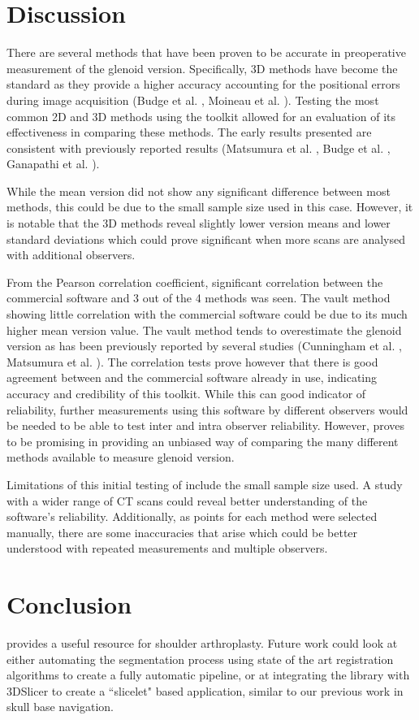 \section{Discussion}
\label{sec:discussion}
There are several methods that have been proven to be accurate in preoperative measurement of 
the glenoid version. Specifically, 3D methods have become the standard as they
provide a higher accuracy accounting for the positional errors during image acquisition
(Budge et al. \cite{BUDGE2011577}, Moineau et al. \cite{PMID:22964089}). 
Testing the most common 2D and 3D methods using the 
\sksglenoid toolkit allowed for an evaluation of its effectiveness in comparing these methods. 
The early results presented are consistent with 
previously reported results (Matsumura et al. \cite{PMID:24618285}, 
Budge et al. \cite{BUDGE2011577}, Ganapathi et al. \cite{PMID:20933439}).

While the mean version did not show any significant difference between most methods, 
this could be due to the small sample size used in this case. However, it is notable
that the 3D methods reveal slightly lower version means and lower standard deviations
which could prove significant when more scans are analysed with additional observers.

From the Pearson correlation coefficient, significant correlation between the commercial 
software and 3 out of the 4 methods was seen. The vault method showing little correlation
with the commercial software could be due to its much higher mean version value.
The vault method tends to overestimate the glenoid version as has been previously
reported by several studies (Cunningham et al. \cite{PMID:29778592},
Matsumura et al. \cite{PMID:24618285}). 
The correlation
tests prove however that there is good agreement between \sksglenoid and the
commercial software already in use, indicating accuracy and credibility of this toolkit.
While this can good indicator of reliability, further measurements using this software
by different observers would be needed to be able to test inter and intra observer reliability.
However, \sksglenoid proves to be promising in providing an unbiased way of
comparing the many different methods available to measure glenoid version.

Limitations of this initial testing of \sksglenoid include the small sample size used.
A study 
with a wider range of CT scans could reveal better understanding of the software’s reliability. 
Additionally, as points for each method were selected manually, there are some inaccuracies that 
arise which could be better understood with repeated measurements and multiple observers.

\section{Conclusion}
\sksglenoid provides a useful resource for shoulder arthroplasty. Future work could look at either 
automating the segmentation process using state of the art registration algorithms \cite{Fu2020} to create a fully automatic pipeline, or at integrating the library with 3DSlicer to create a 
``slicelet" based application, similar to our previous work \cite{PMID:33937966} in skull base 
navigation.

